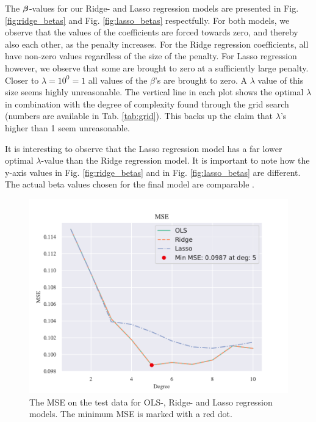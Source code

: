 The $\boldsymbol{\beta}$-values for our Ridge- and Lasso regression models are presented in Fig. \ref{fig:ridge_betas} and Fig. \ref{fig:lasso_betas} respectfully. For both models, we observe that the values of the coefficients are forced towards zero, and thereby also each other, as the penalty increases. For the Ridge regression coefficients, all have non-zero values regardless of the size of the penalty. For Lasso regression however, we observe that some are brought to zero at a sufficiently large penalty. Closer to $\lambda = 10^0 = 1$ all values of the $\beta$'s are brought to zero. A $\lambda$ value of this size seems highly unreasonable. 
The vertical line in each plot shows the optimal $\lambda$ in combination with the degree of complexity found through the grid search (numbers are available in Tab. \ref{tab:grid}). This backs up the claim that $\lambda$'s higher than 1 seem unreasonable. 

It is interesting to observe that the Lasso regression model has a far lower optimal $\lambda$-value than the Ridge regression model. It is important to note how the y-axis values in Fig. \ref{fig:ridge_betas} and in Fig. \ref{fig:lasso_betas} are different. The actual beta values chosen for the final model are comparable . 

\begin{figure}[h!]
    \centering
    \includegraphics[width=1\linewidth]{project_1/figures/figures_in_report/OLS_Ridge_Lasso_Franke_Noise.pdf}
    \caption{The MSE on the test data for OLS-, Ridge- and Lasso regression models. The minimum MSE is marked with a red dot.}
    \label{all3franke}
\end{figure}

